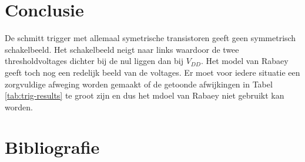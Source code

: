 \documentclass{scrartcl}  %
\begin{document}
\section{Conclusie}
\label{sec:trig-conclusie}
De schmitt trigger met allemaal symetrische transistoren geeft geen symmetrisch schakelbeeld.
Het schakelbeeld neigt naar links waardoor de twee thresholdvoltages dichter bij de nul liggen dan bij $V_{DD}$.
Het model van Rabaey geeft toch nog een redelijk beeld van de voltages.
Er moet voor iedere situatie een zorgvuldige afweging worden gemaakt of de getoonde afwijkingen in Tabel \ref{tab:trig-results} te groot zijn en dus het mdoel van Rabaey niet gebruikt kan worden.
\newpage
{}
\section{Bibliografie}
\printbibliography
\end{document}
